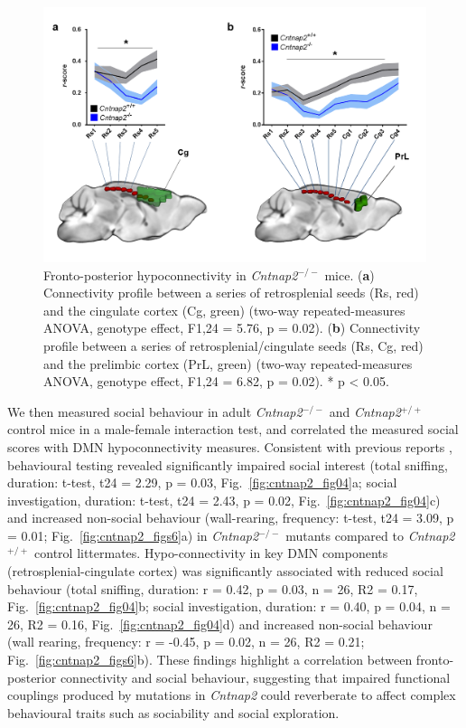 \begin{figure}[th] 
    \centering
    \includegraphics[scale=0.6]{figures/cntnap2_figure_03.png}
    \decoRule
    \caption[Fronto-posterior hypoconnectivity in \textit{Cntnap2}$^{-/-}$
    mice.]{Fronto-posterior hypoconnectivity in \textit{Cntnap2}$^{-/-}$ mice. (\textbf{a})
    Connectivity profile between a series of retrosplenial seeds (Rs, red) and
    the cingulate cortex (Cg, green) (two-way repeated-measures ANOVA, genotype
    effect, F1,24 = 5.76, p = 0.02). (\textbf{b}) Connectivity profile between a
    series of retrosplenial/cingulate seeds (Rs, Cg, red) and the prelimbic
    cortex (PrL, green) (two-way repeated-measures ANOVA, genotype effect, F1,24
    = 6.82, p = 0.02). * p < 0.05.}
    \label{fig:cntnap2_fig03}
\end{figure}

We then measured social behaviour in adult \textit{Cntnap2}$^{-/-}$ and \textit{Cntnap2}$^{+/+}$ control
mice in a male-female interaction test, and correlated the measured social
scores with DMN hypoconnectivity measures. Consistent with previous reports
\parencite{penagarikano2011}, behavioural testing revealed significantly
impaired social interest (total sniffing, duration: t-test, t24 = 2.29, p =
0.03, Fig.~\ref{fig:cntnap2_fig04}a; social investigation, duration: t-test, t24
= 2.43, p = 0.02, Fig.~\ref{fig:cntnap2_fig04}c) and increased non-social
behaviour (wall-rearing, frequency: t-test, t24 = 3.09, p = 0.01;
Fig.~\ref{fig:cntnap2_figs6}a) in \textit{Cntnap2}$^{-/-}$ mutants compared to \textit{Cntnap2}$^{+/+}$
control littermates. Hypo-connectivity in key DMN components
(retrosplenial-cingulate cortex) was significantly associated with reduced
social behaviour (total sniffing, duration: r = 0.42, p = 0.03, n = 26, R2 =
0.17, Fig.~\ref{fig:cntnap2_fig04}b; social investigation, duration: r = 0.40, p
= 0.04, n = 26, R2 = 0.16, Fig.~\ref{fig:cntnap2_fig04}d) and increased
non-social behaviour (wall rearing, frequency: r = -0.45, p = 0.02, n = 26, R2 =
0.21; Fig.~\ref{fig:cntnap2_figs6}b). These findings highlight a correlation
between fronto-posterior connectivity and social behaviour, suggesting that
impaired functional couplings produced by mutations in \textit{Cntnap2} could reverberate
to affect complex behavioural traits such as sociability and social exploration.

